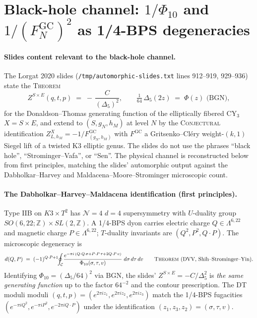 \providecommand{\ClaimStatusTheorem}{\textsc{Theorem}}
\providecommand{\ClaimStatusConjectured}{\textsc{Conjectural}}
\providecommand{\kBKM}{\kappa_{\mathrm{BKM}}}
\providecommand{\kch}{\kappa_{\mathrm{ch}}}
\providecommand{\kcat}{\kappa_{\mathrm{cat}}}

\section*{Black-hole channel: $1/\Phi_{10}$ and $1/(F^{\mathrm{GC}}_N)^2$ as 1/4-BPS degeneracies}

\paragraph{Slides content relevant to the black-hole channel.}
The Lorgat 2020 slides (\texttt{/tmp/automorphic-slides.txt} lines 912--919,
929--936) state the \ClaimStatusTheorem{}
\[
Z^{S\times E}(q,t,p) \;=\; -\,\frac{C}{(\Delta_5)^{2}},
\qquad
\tfrac{1}{64}\,\Delta_5(2z) \;=\; \Phi(z) \text{ (BGN)},
\]
for the Donaldson--Thomas generating function of the elliptically
fibered $\mathrm{CY}_3$ $X=S\times E$, and extend to $(S,g_N,h_M)$ at
level $N$ by the \ClaimStatusConjectured{} identification
$Z^{X}_{L,h_M}= -1/F^{\mathrm{GC}}_{(g_N,h_M)}$ with $F^{\mathrm{GC}}$
a Gritsenko--Cl\'ery weight-$(k,1)$ Siegel lift of a twisted K3
elliptic genus. The slides do not use the phrases ``black hole'',
``Strominger--Vafa'', or ``Sen''. The physical channel is reconstructed
below from first principles, matching the slides' automorphic output
against the Dabholkar--Harvey \cite{DabholkarHarvey1989} and
Maldacena--Moore--Strominger \cite{MaldacenaMooreStrominger1999}
microscopic count.

\paragraph{The Dabholkar--Harvey--Maldacena identification (first principles).}
Type IIB on $K3\times T^2$ has $\mathcal{N}=4$ $d=4$ supersymmetry with
$U$-duality group $SO(6,22;\mathbb{Z})\times SL(2,\mathbb{Z})$. A
1/4-BPS dyon carries electric charge $Q\in \Lambda^{6,22}$ and magnetic
charge $P\in \Lambda^{6,22}$; $T$-duality invariants are
$(Q^2, P^2, Q\!\cdot\! P)$. The microscopic degeneracy is
\[
d(Q,P) \;=\; (-1)^{Q\cdot P+1}\!\!\oint_{\mathcal{C}} \!
\frac{e^{-\pi i\,(Q\cdot Q\,\sigma + P\cdot P\,\tau + 2 Q\cdot P\,v)}}
{\Phi_{10}(\sigma,\tau,v)} \; d\sigma\, d\tau\, dv
\qquad \ClaimStatusTheorem\text{ (DVV, Shih--Strominger--Yin).}
\]
Identifying $\Phi_{10}=(\Delta_5/64)^2$ via BGN, the slides'
$Z^{S\times E}=-C/\Delta_5^{2}$ is \emph{the same generating function}
up to the factor $64^{-2}$ and the contour prescription. The DT moduli
moduli $(q,t,p)=(e^{2\pi i z_1}, e^{2\pi i z_2}, e^{2\pi i z_3})$
match the 1/4-BPS fugacities $(e^{-\pi i Q^2},e^{-\pi i P^2},
e^{-2\pi i Q\cdot P})$ under the identification
$(z_1,z_3,z_2)=(\sigma,\tau,v)$.

